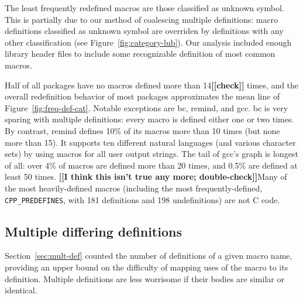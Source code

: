 \documentclass[10pt]{article}
\newcommand{\comment}[1]{\textbf{[[#1]]}}
\newcommand{\pkg}[1]{\textsf{#1}}
\newcommand{\captionsmall}[1]{\caption[]{\small #1}}
\begin{document}
The least frequently redefined macros are those classified as unknown
symbol.  This is partially due to our method of coalescing multiple
definitions:  macro definitions classified as unknown symbol are overriden
by definitions with any other classification (see
Figure~\ref{fig:category-lub}).  Our
analysis included enough library header files to include some
recognizable definition of most common macros.

Half of all packages have no macros defined more than 14\comment{check} times, and the
overall redefinition behavior of most packages approximates the mean line
of Figure~\ref{fig:freq-def-cat}.  Notable exceptions are \pkg{bc},
\pkg{remind}, and \pkg{gcc}.  \pkg{bc} is very sparing with multiple
definitions: every macro is defined either one or two times.  By contrast, 
\pkg{remind} defines 10\% of its macros more than 10 times (but none more
than 15).  It supports ten different natural languages (and various character
sets) by using macros for all user output strings.  The tail of \pkg{gcc}'s
graph is longest of all: over 4\% of macros are defined more than 20 times,
and 0.5\% are defined at least 50 times.  \comment{I think this isn't true
any more; double-check}Many of the most heavily-defined
macros (including the most frequently-defined, \verb|CPP_PREDEFINES|, with
181 definitions and 198 undefinitions) are not C code.


        
\subsection{Multiple differing definitions}

Section~\ref{sec:mult-def} counted the number of definitions of a given
macro name, providing an upper bound on the difficulty of
mapping uses of the macro to its definition.  Multiple definitions are less worrisome if
their bodies are similar or identical.

        
%   
\end{document}
